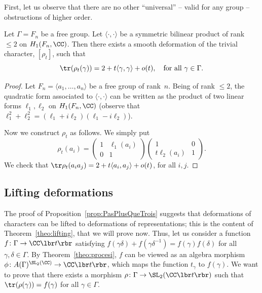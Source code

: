 First, let us observe that there are no other ``universal'' -- \ie valid
for any group -- obstructions of higher order.
\begin{proposition}\label{prop:PasPlusQueTrois}
Let $\Gamma=F_n$ be a free group. Let $\langle\cdot,\cdot\rangle$ be a
symmetric bilinear product of rank $\leq 2$ on $H_1(F_n,\CC)$.
Then there exists a smooth deformation
of the trivial character, $[\rho_t]$, such that
\[ \tr(\rho_t(\gamma))=2+t\langle\gamma,\gamma\rangle+
o(t), \quad\text{for all }\gamma\in\Gamma. \]
\end{proposition}

\begin{proof}
Let $F_n=\langle a_1,\ldots,a_n\rangle$ be a free group of rank~$n$.
Being of rank $\leq 2$, the quadratic form associated to
$\langle\cdot,\cdot\rangle$
can be written as the product of two linear forms $\ell_1,\ell_2$ on
$H_1(F_n,\CC)$
(observe that $\ell_1^2+\ell_2^2=(\ell_1+i\ell_2)(\ell_1-i\ell_2)$).

Now we construct $\rho_t$ as follows. We simply put
\[ \rho_t(a_i)=\left(\begin{array}{cc}1 & \ell_1(a_i) \\ 0 & 1 \end{array}
\right)\left(\begin{array}{cc}1 & 0 \\ t\ell_2(a_i) & 1\end{array}\right).\]
We check that $\tr\rho_t(a_ia_j)=2+t\langle a_i,a_j\rangle+o(t)$,
for all $i,j$.
\end{proof}

\subsection{Lifting deformations}\label{sec:lifting}

The proof of Proposition~\ref{prop:PasPlusQueTrois} suggests that
deformations of characters can be lifted to deformations of representations;
this is the content of Theorem~\ref{theo:lifting}, that we will prove now.
Thus, let us consider a function $f\colon\Gamma\to\CC\lbr t\rbr$ satisfying
$f(\gamma\delta)+f(\gamma\delta^{-1})=f(\gamma)f(\delta)$ for all
$\gamma,\delta\in\Gamma$. By Theorem~\ref{theo:procesi},
$f$ can be viewed as an algebra morphism
$\phi\colon A(\Gamma)^{\SL_2(\CC)}\to\CC\lbr t\rbr$, which maps the function
$t_\gamma$ to $f(\gamma)$. We want to prove that there exists a morphism
$\rho\colon\Gamma\to\SL_2(\CC\lbr t\rbr)$ such that $\tr(\rho(\gamma))=f(\gamma)$
for all $\gamma\in\Gamma$.

